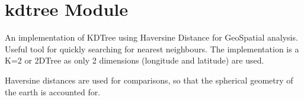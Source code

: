 \documentclass[letterpaper,10pt,english]{sphinxmanual}
\begin{document}
\section{kdtree Module}
\label{\detokenize{kdtree:module-geotrees.kdtree}}\label{\detokenize{kdtree:kdtree-module}}
\sphinxAtStartPar
An implementation of KDTree using Haversine Distance for GeoSpatial analysis.
Useful tool for quickly searching for nearest neighbours. The implementation is
a K=2 or 2DTree as only 2 dimensions (longitude and latitude) are used.

\sphinxAtStartPar
Haversine distances are used for comparisons, so that the spherical geometry
of the earth is accounted for.
\end{document}
